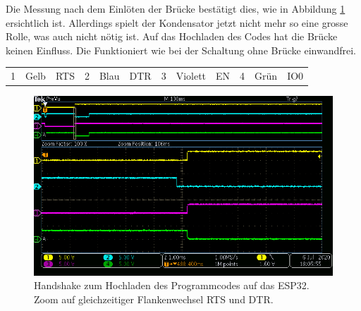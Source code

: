 \begin{enumerate}
\begin{enumerate}
Die Messung nach dem Einlöten der Brücke bestätigt dies, wie in Abbildung \ref{fig:ESP32_RTS_DTR_EN_IO0_mit_Bruecke_1} ersichtlich ist. Allerdings spielt der Kondensator jetzt nicht mehr so eine grosse Rolle, was auch nicht nötig ist. Auf das Hochladen des Codes hat die Brücke keinen Einfluss. Die Funktioniert wie bei der Schaltung ohne Brücke einwandfrei.
\begin{table}[h!]
\center
\begin{tabular}{lcl|lcl|lcl|lcl}
1 & Gelb & RTS & 2 & Blau & DTR & 3 & Violett & EN & 4 & Grün & IO0\\
\end{tabular}
\end{table}
\begin{figure}[h!]
\center
\includegraphics[width = \textwidth]{graphics/ESP32_RTS_DTR_EN_IO0_mit_Bruecke_1}
\caption{Handshake zum Hochladen des Programmcodes auf das ESP32. Zoom auf gleichzeitiger Flankenwechsel RTS und DTR.}
\label{fig:ESP32_RTS_DTR_EN_IO0_mit_Bruecke_1}
\end{figure}
\end{enumerate}

\end{enumerate}
